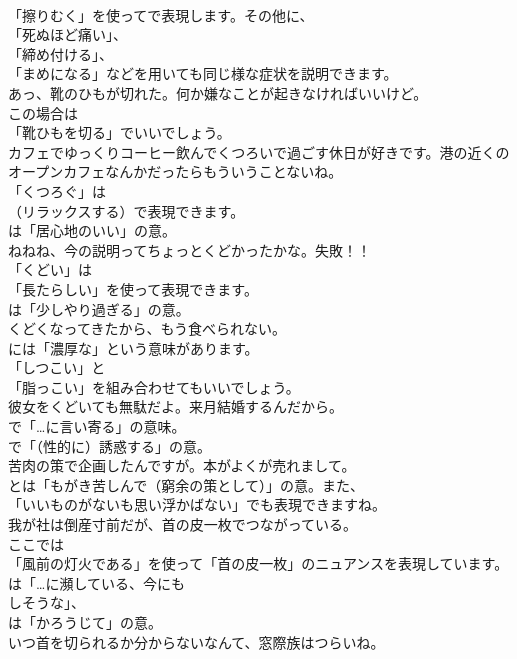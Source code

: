 \documentclass[8pt]{extreport}
\begin{document}
\begin{CJK}{UTF8}{min}
\\	「擦りむく」を使ってで表現します。その他に、
\\	「死ぬほど痛い」、
\\	「締め付ける」、
\\	「まめになる」などを用いても同じ様な症状を説明できます。	
\\	あっ、靴のひもが切れた。何か嫌なことが起きなければいいけど。 
\\	この場合は
\\	「靴ひもを切る」でいいでしょう。	
\\	カフェでゆっくりコーヒー飲んでくつろいで過ごす休日が好きです。港の近くのオープンカフェなんかだったらもういうことないね。 
\\	「くつろぐ」は 
\\	（リラックスする）で表現できます。
\\	は「居心地のいい」の意。	
\\	ねねね、今の説明ってちょっとくどかったかな。失敗！！ 
\\	「くどい」は
\\	「長たらしい」を使って表現できます。
\\	は「少しやり過ぎる」の意。	
\\	くどくなってきたから、もう食べられない。 
\\	には「濃厚な」という意味があります。
\\	「しつこい」と
\\	「脂っこい」を組み合わせてもいいでしょう。	
\\	彼女をくどいても無駄だよ。来月結婚するんだから。 
\\	で「…に言い寄る」の意味。
\\	で「（性的に）誘惑する」の意。	
\\	苦肉の策で企画したんですが。本がよくが売れまして。 
\\	とは「もがき苦しんで（窮余の策として）」の意。また、
\\	「いいものがないも思い浮かばない」でも表現できますね。	
\\	我が社は倒産寸前だが、首の皮一枚でつながっている。 
\\	ここでは
\\	「風前の灯火である」を使って「首の皮一枚」のニュアンスを表現しています。
\\	は「…に瀕している、今にも 
\\	しそうな」、
\\	は「かろうじて」の意。	
\\	いつ首を切られるか分からないなんて、窓際族はつらいね。 

\end{CJK}
\end{document}
